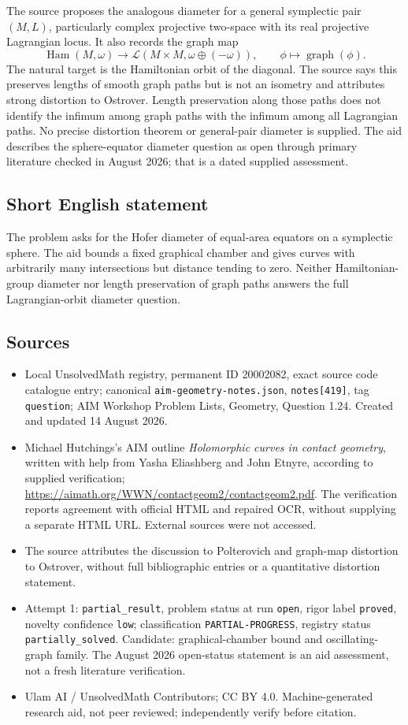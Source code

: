 \documentclass[11pt]{article}
\begin{document}
The source proposes the analogous diameter for a general symplectic pair \((M,L)\), particularly complex projective two-space with its real projective Lagrangian locus. It also records the graph map
\[
 \operatorname{Ham}(M,\omega)\longrightarrow
 \mathcal L(M\times M,\omega\oplus(-\omega)),\qquad
 \phi\longmapsto\operatorname{graph}(\phi).
\]
The natural target is the Hamiltonian orbit of the diagonal. The source says this preserves lengths of smooth graph paths but is not an isometry and attributes strong distortion to Ostrover. Length preservation along those paths does not identify the infimum among graph paths with the infimum among all Lagrangian paths. No precise distortion theorem or general-pair diameter is supplied. The aid describes the sphere-equator diameter question as open through primary literature checked in August 2026; that is a dated supplied assessment.
\subsection{Short English statement}
The problem asks for the Hofer diameter of equal-area equators on a symplectic sphere. The aid bounds a fixed graphical chamber and gives curves with arbitrarily many intersections but distance tending to zero. Neither Hamiltonian-group diameter nor length preservation of graph paths answers the full Lagrangian-orbit diameter question.
\subsection{Sources}
\begin{itemize}
\item Local UnsolvedMath registry, permanent ID 20002082, exact source code catalogue entry; canonical \texttt{aim-geometry-notes.json}, \texttt{notes[419]}, tag \texttt{question}; AIM Workshop Problem Lists, Geometry, Question 1.24. Created and updated 14 August 2026.
\item Michael Hutchings's AIM outline \emph{Holomorphic curves in contact geometry}, written with help from Yasha Eliashberg and John Etnyre, according to supplied verification; \url{https://aimath.org/WWN/contactgeom2/contactgeom2.pdf}. The verification reports agreement with official HTML and repaired OCR, without supplying a separate HTML URL. External sources were not accessed.
\item The source attributes the discussion to Polterovich and graph-map distortion to Ostrover, without full bibliographic entries or a quantitative distortion statement.
\item Attempt 1: \texttt{partial\_result}, problem status at run \texttt{open}, rigor label \texttt{proved}, novelty confidence \texttt{low}; classification \texttt{PARTIAL-PROGRESS}, registry status \texttt{partially\_solved}. Candidate: graphical-chamber bound and oscillating-graph family. The August 2026 open-status statement is an aid assessment, not a fresh literature verification.
\item Ulam AI / UnsolvedMath Contributors; CC BY 4.0. Machine-generated research aid, not peer reviewed; independently verify before citation.
\end{itemize}
\end{document}
